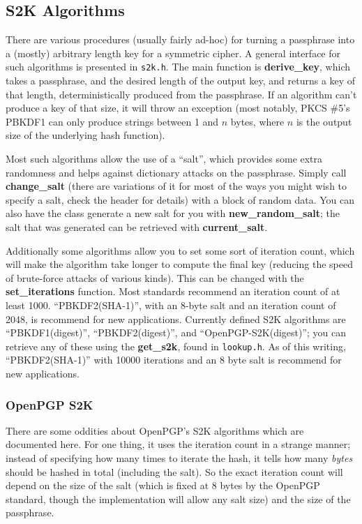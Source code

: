 \documentclass{article}
\newcommand{\filename}[1]{\texttt{#1}}
\newcommand{\function}[1]{\textbf{#1}}
\begin{document}
\subsection{S2K Algorithms}

There are various procedures (usually fairly ad-hoc) for turning a passphrase
into a (mostly) arbitrary length key for a symmetric cipher. A general
interface for such algorithms is presented in \filename{s2k.h}. The main
function is \function{derive\_key}, which takes a passphrase, and the desired
length of the output key, and returns a key of that length, deterministically
produced from the passphrase. If an algorithm can't produce a key of that size,
it will throw an exception (most notably, PKCS \#5's PBKDF1 can only produce
strings between 1 and $n$ bytes, where $n$ is the output size of the underlying
hash function).

Most such algorithms allow the use of a ``salt'', which provides some extra
randomness and helps against dictionary attacks on the passphrase. Simply call
\function{change\_salt} (there are variations of it for most of the ways you
might wish to specify a salt, check the header for details) with a block of
random data. You can also have the class generate a new salt for you with
\function{new\_random\_salt}; the salt that was generated can be retrieved with
\function{current\_salt}.

Additionally some algorithms allow you to set some sort of iteration count,
which will make the algorithm take longer to compute the final key (reducing
the speed of brute-force attacks of various kinds). This can be changed with
the \function{set\_iterations} function. Most standards recommend an iteration
count of at least 1000. ``PBKDF2(SHA-1)'', with an 8-byte salt and an iteration
count of 2048, is recommend for new applications. Currently defined S2K
algorithms are ``PBKDF1(digest)'', ``PBKDF2(digest)'', and
``OpenPGP-S2K(digest)''; you can retrieve any of these using the
\function{get\_s2k}, found in \filename{lookup.h}. As of this writing,
``PBKDF2(SHA-1)'' with 10000 iterations and an 8 byte salt is recommend for new
applications.

\subsubsection{OpenPGP S2K}

There are some oddities about OpenPGP's S2K algorithms which are documented
here. For one thing, it uses the iteration count in a strange manner; instead
of specifying how many times to iterate the hash, it tells how many
\emph{bytes} should be hashed in total (including the salt). So the exact
iteration count will depend on the size of the salt (which is fixed at 8 bytes
by the OpenPGP standard, though the implementation will allow any salt size)
and the size of the passphrase.
\end{document}
